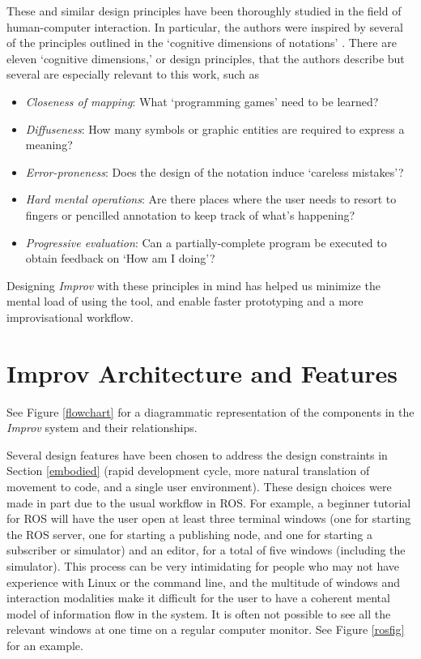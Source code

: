 \documentclass[sigchi-a]{acmart}
\begin{document}
These and similar design principles have been thoroughly studied in the field
of human-computer interaction. In particular, the authors were inspired by several of the principles
outlined in the `cognitive dimensions of notations' \cite{green1996usability}.
There are eleven `cognitive dimensions,' or design principles, that the authors
describe but several are especially relevant to this work, such as

\begin{itemize}
\item \emph{Closeness of mapping}: What `programming games' need to be learned?
\item \emph{Diffuseness}: How many symbols or graphic entities are required to express a meaning?
\item \emph{Error-proneness}: Does the design of the notation induce `careless mistakes'?
\item \emph{Hard mental operations}: Are there places where the user needs to resort to  fingers or pencilled annotation to keep track of what's happening?
\item \emph{Progressive evaluation}: Can a partially-complete program be executed to
obtain feedback on `How am I doing'?
\end{itemize}

Designing \emph{Improv} with these principles in mind has helped us minimize the mental
load of using the tool, and enable faster prototyping and a more
improvisational workflow.


\section{Improv Architecture and Features}\label{architecture-overview}

See Figure \ref{flowchart} for a diagrammatic representation of
the components in the \emph{Improv} system and their relationships.

Several design features have been chosen to
address the design constraints in Section \ref{embodied} (rapid development
cycle, more natural translation of movement to code, and a single user environment).
These design choices were made in part due to the usual workflow in ROS. For
example, a beginner tutorial for ROS will have the user open at least three
terminal windows (one for starting the ROS server, one for starting a
publishing node, and one for starting a subscriber or simulator) and an editor,
for a total of five windows (including the simulator). This process can be very
intimidating for people who may not have experience with Linux or the command
line, and the multitude of windows and interaction modalities make it difficult
for the user to have a coherent mental model of information flow in the system.
It is often not possible to see all the relevant windows at one time on a
regular computer monitor. See Figure \ref{rosfig} for an example.
\end{document}
